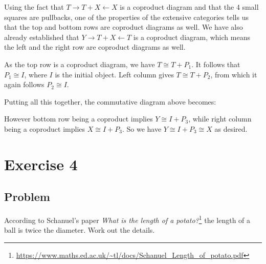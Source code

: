 \documentclass{article}
\begin{document}
Using the fact that $T \rightarrow T+X \leftarrow X$ is a coproduct diagram and that the 4 small squares are pullbacks, one of the properties of the extensive categories tells us that the top and bottom rows are coproduct diagrams as well. We have also already established that $Y \rightarrow T+X \leftarrow T$ is a coproduct diagram, which means the left and the right row are coproduct diagrams as well.

As the top row is a coproduct diagram, we have $T \cong T+P_1$. It follows that $P_1 \cong I$, where $I$ is the initial object.
Left column gives $T \cong T + P_2$, from which it again follows $P_2 \cong I$.

Putting all this together, the commutative diagram above becomes:


\begin{center}\end{center}


However bottom row being a coproduct implies $Y \cong I + P_3$, while right column being a coproduct implies $X \cong I + P_3$.
So we have $Y \cong I+P_3 \cong X$ as desired.
\newpage
\section*{Exercise 4}
\subsection*{Problem}
According to Schanuel's paper \textit{What is the length of a potato?}\footnote{\url{https://www.maths.ed.ac.uk/~tl/docs/Schanuel_Length_of_potato.pdf}} the length of a ball is twice the diameter. Work out the details.
\end{document}
